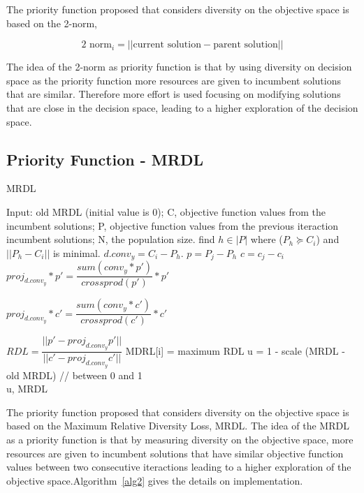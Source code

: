 The priority function proposed that considers diversity on the objective space is based on the 2-norm,

\begin{equation}
 \text{2 norm}_i = ||\text{current solution} - \text{parent solution}||
\end{equation}

The idea of the 2-norm as priority function is that by using diversity on decision space as the priority function more resources are given to incumbent solutions that are similar. Therefore more effort is used focusing on modifying solutions that are close in the decision space, leading to a higher exploration of the decision space.


\subsection{Priority Function - MRDL} 


\begin{algorithm}[t]
	\caption{MRDL}\label{alg2}
	\begin{algorithmic}[1]
		
		\State Input: old MRDL (initial value is 0); C, objective function values from the incumbent solutions; P, objective function values from the previous iteraction incumbent solutions; N, the population size.
		\State find $h \in |P|$ where  ($P_h \succeq C_i$) and $||P_h - C_i  ||$ is minimal.
		\State $d.conv_{y} = C_i - P_h$.
		\State $p = P_j - P_h$
		\State $c = c_j - c_i$
		\State $proj_{d.conv_{y}}*p \prime = \dfrac{sum(conv_{y}*p \prime)}{crossprod(p \prime)}*p \prime$
		
		\State $ proj_{d.conv_{y}}*c \prime = \dfrac{sum(conv_{y}*c \prime)}{crossprod(c \prime)}*c \prime$
		
		\State $RDL = \dfrac{ ||p \prime - proj_{d.conv_{y}}p \prime|| }{||c \prime - proj_{d.conv_{y}}c \prime||}            $
		\EndFor
		MDRL[i] = maximum RDL
		\EndFor
		\State u = 1 - scale (MRDL - old MRDL) // between 0 and 1\\
	\Return u, MRDL
	\end{algorithmic}
\end{algorithm}

The priority function proposed that considers diversity on the objective space is based on the Maximum Relative Diversity Loss, MRDL. The idea of the MRDL as a priority function is that by measuring diversity on the objective space, more resources are given to incumbent solutions that have similar objective function values between two consecutive iteractions leading to a higher exploration of the objective space.Algorithm~\ref{alg2} gives the details on implementation.
 
